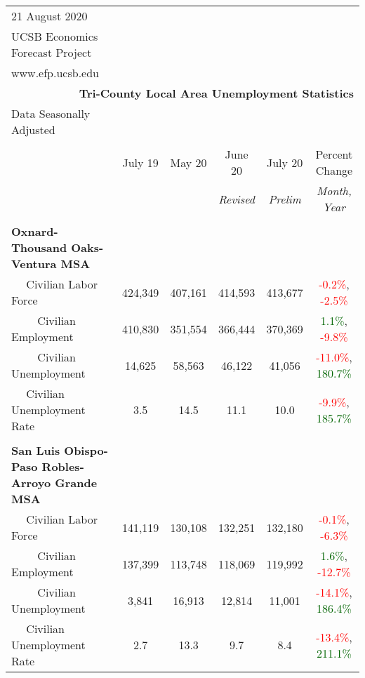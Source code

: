\documentclass[12pt]{article}
\begin{document}
\begin{landscape}
\begin{table}
\begin{tabular}{|l|c|c|c|c|c|}
\multicolumn{1}{l}{\small 21 August 2020} & \multicolumn{5}{c}{} \\
\multicolumn{1}{l}{\small UCSB Economics Forecast Project} & \multicolumn{5}{c}{} \\
\multicolumn{1}{l}{\small www.efp.ucsb.edu} & \multicolumn{5}{c}{} \\
\multicolumn{6}{r}{\large \textbf{Tri-County Local Area Unemployment Statistics}} \\
\multicolumn{1}{l}{\small Data Seasonally Adjusted} & \multicolumn{5}{c}{} \\ \hline \hline
& & & & & \\
 & July 19 & May 20 & June 20 & July 20 & Percent Change \\
 & & & \small \textit{Revised} & \small \textit{Prelim} & \small \textit{Month, Year} \\ \hline
&&&&& \\
\textbf{Oxnard-Thousand Oaks-Ventura MSA} &&&&& \\
$\quad$ Civilian Labor Force &424,349 & 407,161 & 414,593 & 413,677 & \textcolor{red}{-0.2\%}, \textcolor{red}{-2.5\%} \\
$\qquad$ \small Civilian Employment &410,830 & 351,554 & 366,444 & 370,369 & \textcolor{darkgreen}{1.1\%}, \textcolor{red}{-9.8\%} \\
$\qquad$ \small Civilian Unemployment &14,625 & 58,563 & 46,122 & 41,056 & \textcolor{red}{-11.0\%}, \textcolor{darkgreen}{180.7\%} \\
$\quad$ Civilian Unemployment Rate &3.5 & 14.5 & 11.1 & 10.0 & \textcolor{red}{-9.9\%}, \textcolor{darkgreen}{185.7\%} \\
&&&&& \\
\textbf{San Luis Obispo-Paso Robles-Arroyo Grande MSA} &&&&& \\
$\quad$ Civilian Labor Force &141,119 & 130,108 & 132,251 & 132,180 & \textcolor{red}{-0.1\%}, \textcolor{red}{-6.3\%} \\
$\qquad$ \small Civilian Employment &137,399 & 113,748 & 118,069 & 119,992 & \textcolor{darkgreen}{1.6\%}, \textcolor{red}{-12.7\%} \\
$\qquad$ \small Civilian Unemployment &3,841 & 16,913 & 12,814 & 11,001 & \textcolor{red}{-14.1\%}, \textcolor{darkgreen}{186.4\%} \\
$\quad$ Civilian Unemployment Rate &2.7 & 13.3 & 9.7 & 8.4 & \textcolor{red}{-13.4\%}, \textcolor{darkgreen}{211.1\%} \\

\end{tabular}
\end{table}
\end{landscape}
\end{document}
